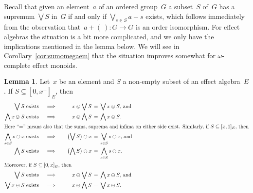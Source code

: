 \documentclass[10pt,conference]{IEEEtran}
\newcounter{counter}
\theoremstyle{definition}
\newtheorem{lemma}[counter]{Lemma}
\begin{document}
Recall that given an element~$a$ of an
ordered group~$G$
a subset~$S$ of~$G$ has a supremum $\bigvee S$ in~$G$
if and only if $\bigvee_{s\in S} a+s$ exists,
which follows immediately from 
the observation that~$a+(\ )\colon G\to G$ is an order isomorphism.
For effect algebras
the situation is a bit more complicated,
and we only have the implications
mentioned in the lemma below.
We will see in Corollary~\ref{cor:sumomegaem}
that the situation improves
somewhat
for $\omega$-complete effect monoids.
\begin{lemma}\label{lem:additionisnormal}
Let~$x$ be an element and $S$ a non-empty
subset of an effect algebra~$E$.
    If $S\subseteq [0,x^\perp]_E$, then
\begin{alignat*}{3}
    \text{$\bigvee S$ exists}
    \quad&\implies\quad&
    x\ovee \bigvee S &\,=\,
    \bigvee x\ovee S\text{, and}
    \\
    \text{$\bigwedge x\ovee S$ exists}
    \quad&\implies\quad&
x\ovee \bigwedge S &\,=\,
    \bigwedge x\ovee S \text{.}
    \\
    \intertext{Here ``$=$'' means also that the 
    sums, suprema and infima on either side exist.
    Similarly, if $S\subseteq [x,1]_E$, then}
    \text{$\bigwedge_{s\in S} s\ominus x$ exists}
    \quad&\implies\quad&
\bigl(\bigvee S\bigr) \ominus x
     &\,=\, 
    \bigvee_{s\in S} s \ominus x\text{, and}
    \\
    \text{$\bigwedge S$ exists}
    \quad&\implies\quad&
\bigl(\bigwedge S\bigr) \ominus x
     &\,=\, 
    \bigwedge_{s\in S} s \ominus x\text{.}
    \\
\intertext{Moreover, if $S\subseteq[0,x]_E$, then}
    \text{$\bigvee S$ exists}
    \quad&\implies\quad&
x \ominus \bigvee S
     &\,=\,
    \bigwedge x\ominus S\text{, and}
    \\
    \text{$\bigvee x \ominus S$ exists}
    \quad&\implies\quad&
x \ominus \bigwedge S
     &\,=\, 
    \bigvee x\ominus S\text{.}
\end{alignat*}
\end{lemma}
\end{document}

